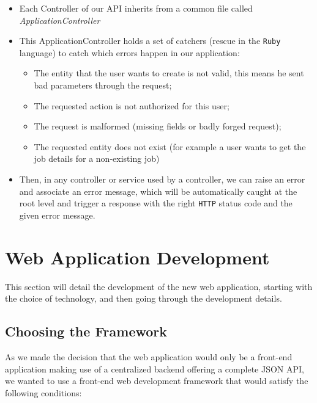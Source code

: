 \documentclass{eplmastersthesis}
\begin{document}
          \begin{itemize}
            \item Each Controller of our API inherits from a common file
            called \textit{ApplicationController}
            \item This ApplicationController holds a set of catchers (rescue
            in the \texttt{Ruby} language) to catch which errors happen in our
            application:
              \begin{itemize}
                \item The entity that the user wants to create is not valid,
                this means he sent bad parameters through the request;
                \item The requested action is not authorized for this user;
                \item The request is malformed (missing fields or badly forged
                request);
                \item The requested entity does not exist (for example a user
                wants to get the job details for a non-existing job)
              \end{itemize}
            \item Then, in any controller or service used by a controller, we
            can raise an error and associate an error message, which will be
            automatically caught at the root level and trigger a response with
            the right \texttt{HTTP} status code and the given error message.
          \end{itemize}

    \section{Web Application Development}

      This section will detail the development of the new web application,
      starting with the choice of technology, and then going through the
      development details.

      \subsection{Choosing the Framework}

        As we made the decision that the web application would only be a
        front-end application making use of a centralized backend offering
        a complete JSON API, we wanted to use a front-end web development
        framework that would satisfy the following conditions: \\
\end{document}
